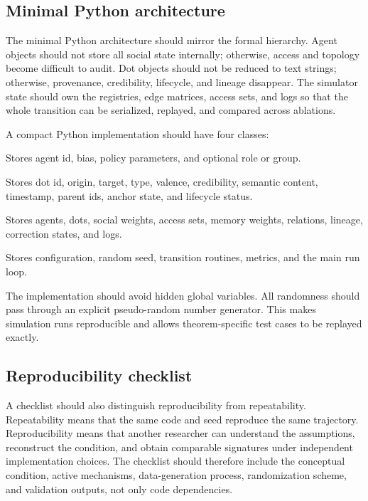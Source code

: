 \documentclass[11pt]{article}
\theoremstyle{remark}
\begin{document}
\subsection{Minimal Python architecture}\label{minimal-python-architecture}

The minimal Python architecture should mirror the formal hierarchy. Agent objects should not store all social state internally; otherwise, access and topology become difficult to audit. Dot objects should not be reduced to text strings; otherwise, provenance, credibility, lifecycle, and lineage disappear. The simulator state should own the registries, edge matrices, access sets, and logs so that the whole transition can be serialized, replayed, and compared across ablations.


A compact Python implementation should have four classes:

\begin{description}[leftmargin=2.8cm,style=nextline]
\item[Agent]
Stores agent id, bias, policy parameters, and optional role or group.

\item[Dot]
Stores dot id, origin, target, type, valence, credibility, semantic
content, timestamp, parent ids, anchor state, and lifecycle status.

\item[DotTraceState]
Stores agents, dots, social weights, access sets, memory weights,
relations, lineage, correction states, and logs.

\item[DotTraceSimulator]
Stores configuration, random seed, transition routines, metrics, and the
main run loop.
\end{description}

The implementation should avoid hidden global variables. All randomness
should pass through an explicit pseudo-random number generator. This
makes simulation runs reproducible and allows theorem-specific test cases
to be replayed exactly.

\subsection{Reproducibility checklist}\label{reproducibility-checklist}

A checklist should also distinguish reproducibility from repeatability. Repeatability means that the same code and seed reproduce the same trajectory. Reproducibility means that another researcher can understand the assumptions, reconstruct the condition, and obtain comparable signatures under independent implementation choices. The checklist should therefore include the conceptual condition, active mechanisms, data-generation process, randomization scheme, and validation outputs, not only code dependencies.
\end{document}
